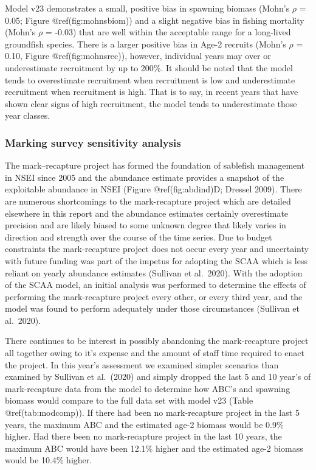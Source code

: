 \documentclass[
]{article}
\begin{document}
Model v23 demonstrates a small, positive bias in spawning biomass
(Mohn's \(\rho\) = 0.05; Figure @ref(fig:mohnsbiom)) and a slight
negative bias in fishing mortality (Mohn's \(\rho\) = -0.03) that are
well within the acceptable range for a long-lived groundfish species.
There is a larger positive bias in Age-2 recruits (Mohn's \(\rho\) =
0.10, Figure @ref(fig:mohnsrec)), however, individual years may over or
underestimate recruitment by up to 200\%. It should be noted that the
model tends to overestimate recruitment when recruitment is low and
underestimate recruitment when recruitment is high. That is to say, in
recent years that have shown clear signs of high recruitment, the model
tends to underestimate those year classes.

\hypertarget{marking-survey-sensitivity-analysis}{%
\subsubsection{Marking survey sensitivity
analysis}\label{marking-survey-sensitivity-analysis}}

The mark--recapture project has formed the foundation of sablefish
management in NSEI since 2005 and the abundance estimate provides a
snapshot of the exploitable abundance in NSEI (Figure @ref(fig:abdind)D;
Dressel 2009). There are numerous shortcomings to the mark-recapture
project which are detailed elsewhere in this report and the abundance
estimates certainly overestimate precision and are likely biased to some
unknown degree that likely varies in direction and strength over the
course of the time series. Due to budget constraints the mark-recapture
project does not occur every year and uncertainty with future funding
was part of the impetus for adopting the SCAA which is less reliant on
yearly abundance estimates (Sullivan et al.~2020). With the adoption of
the SCAA model, an initial analysis was performed to determine the
effects of performing the mark-recapture project every other, or every
third year, and the model was found to perform adequately under those
circumstances (Sullivan et al.~2020).

There continues to be interest in possibly abandoning the mark-recapture
project all together owing to it's expense and the amount of staff time
required to enact the project. In this year's assessment we examined
simpler scenarios than examined by Sullivan et al.~(2020) and simply
dropped the last 5 and 10 year's of mark-recapture data from the model
to determine how ABC's and spawning biomass would compare to the full
data set with model v23 (Table @ref(tab:modcomp)). If there had been no
mark-recapture project in the last 5 years, the maximum ABC and the
estimated age-2 biomass would be 0.9\% higher. Had there been no
mark-recapture project in the last 10 years, the maximum ABC would have
been 12.1\% higher and the estimated age-2 biomass would be 10.4\%
higher.
\end{document}
